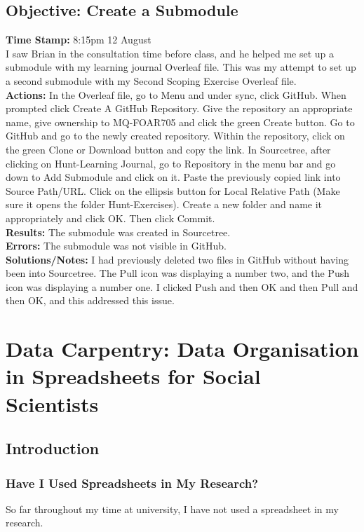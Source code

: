 \documentclass{article}
\begin{document}
\begin{FlushLeft}
\subsection{Objective: Create a Submodule}\label{sec:submodule}
\textbf{Time Stamp:} 8:15pm 12 August\\
I saw Brian in the consultation time before class, and he helped me set up a submodule with my learning journal Overleaf file. This was my attempt to set up a second submodule with my Second Scoping Exercise Overleaf file.\\
\textbf{Actions:} In the Overleaf file, go to Menu and under sync, click GitHub. When prompted click Create A GitHub Repository. Give the repository an appropriate name, give ownership to MQ-FOAR705 and click the green Create button. Go to GitHub and go to the newly created repository. Within the repository, click on the green Clone or Download button and copy the link. In Sourcetree, after clicking on Hunt-Learning Journal, go to Repository in the menu bar and go down to Add Submodule and click on it. Paste the previously copied link into Source Path/URL. Click on the ellipsis button for Local Relative Path (Make sure it opens the folder Hunt-Exercises). Create a new folder and name it appropriately and click OK. Then click Commit.\\
\textbf{Results:} The submodule was created in Sourcetree.\\
\textbf{Errors:} The submodule was not visible in GitHub.\\
\textbf{Solutions/Notes:} I had previously deleted two files in GitHub without having been into Sourcetree. The Pull icon was displaying a number two, and the Push icon was displaying a number one. I clicked Push and then OK and then Pull and then OK, and this addressed this issue.

\pagebreak

\section{Data Carpentry: Data Organisation in Spreadsheets for Social Scientists}

\subsection{Introduction}
\subsubsection*{Have I Used Spreadsheets in My Research?}
So far throughout my time at university, I have not used a spreadsheet in my research.

\end{FlushLeft}
\end{document}
